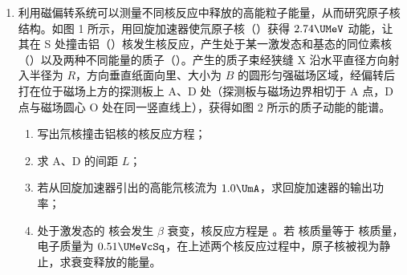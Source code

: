 \documentclass[\gkver]{gaokaozhenti}
\begin{document}
\begin{enumerate}
{设飞机起飞时的速度大小为 $v$，动子及安装其上除飞机外其它装备的速度大小为 $v'$，根据动量守恒定律有 $(M - m)v' + mv = Mv_{m}$

又因为超导线圈磁场快速消失的过程中，第二级回路中产生的感应电动势 $E' = \frac{\Delta\Phi}{\Delta t} = \frac{\Phi}{\Delta t}$

感应电流为 $I' = \frac{E'}{R_{2}} = \frac{\Delta\Phi}{R_{2}\Delta t}$

根据动量定理有 $BI'l \cdot \Delta t = mv - mv_{m}$

解得 $v = v_{m} + \frac{B\Phi l}{mR_{2}} = \frac{BUl}{B^{2}l^{2} + kR_{1}} + \frac{B\Phi l}{mR_{2}}$
}

\item
利用磁偏转系统可以测量不同核反应中释放的高能粒子能量，从而研究原子核结构。如图 1 所示，用回旋加速器使氘原子核（）获得 $2.74\UMeV$ 动能，让其在 S 处撞击铝（）核发生核反应，产生处于某一激发态和基态的同位素核（）以及两种不同能量的质子（）。产生的质子束经狭缝 X 沿水平直径方向射入半径为 $R$，方向垂直纸面向里、大小为 $B$ 的圆形匀强磁场区域，经偏转后打在位于磁场上方的探测板上 A、D 处（探测板与磁场边界相切于 A 点，D 点与磁场圆心 O 处在同一竖直线上），获得如图 2 所示的质子动能的能谱。


\begin{enumerate}
	\item
	写出氘核撞击铝核的核反应方程；
	\item
	求 A、D 的间距 $L$；
	\item
	若从回旋加速器引出的高能氘核流为 $1.0\UmA$，求回旋加速器的输出功率；
	\item
	处于激发态的  核会发生 $\beta$ 衰变，核反应方程是 。若  核质量等于  核质量，电子质量为 $0.51\UMeVcSq$，在上述两个核反应过程中，原子核被视为静止，求衰变释放的能量。
\end{enumerate}

\end{enumerate}
\end{document}
